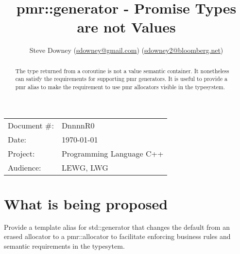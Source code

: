 \documentclass[a4paper,10pt,oneside,openany,final,article]{memoir}
\begin{document}
\title{pmr::generator - Promise Types are not Values}
\author{
  Steve Downey \small(\href{mailto:sdowney@gmail.com}{sdowney@gmail.com}) \small(\href{mailto:sdowney2@bloomberg.net}{sdowney2@bloomberg.net}) \\
}
\date{} %
\maketitle

\begin{flushright}
\begin{tabular}{ll}
Document \#: & DnnnnR0 \\
Date: & \today \\
Project: & Programming Language C++ \\
Audience: & LEWG, LWG
\end{tabular}
\end{flushright}

\begin{abstract}
  The type returned from a coroutine is not a value semantic container.
  It nonetheless can satisfy the requirements for supporting pmr generators.
  It is useful to provide a pmr alias to make the requirement to use pmr allocators visible in the typesystem.
\end{abstract}

\tableofcontents*

\chapter{What is being proposed}
Provide a template alias for std::generator that changes the default from an erased allocator to a pmr::allocator to facilitate enforcing business rules and semantic requirements in the typesytem.
\end{document}
